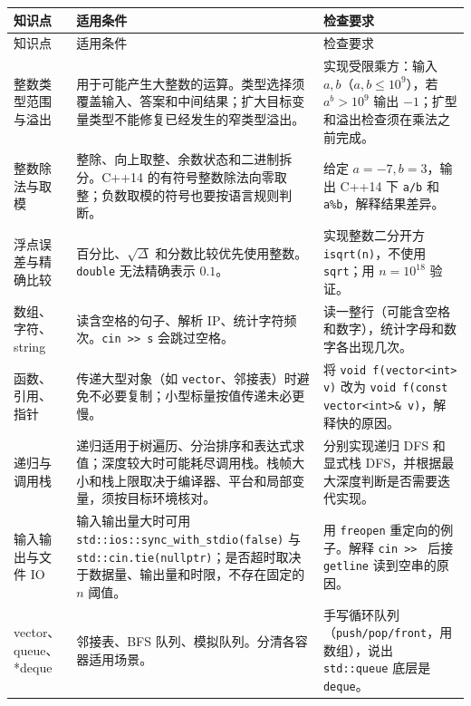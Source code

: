 \documentclass[a4paper,11pt]{article}
\newcommand{\code}[1]{\texttt{#1}}
\begin{document}
\begin{longtable}{L{2.4cm} L{7.5cm} L{6.8cm}}
\toprule
知识点 & 适用条件 & 检查要求 \\
\midrule
\endfirsthead
\toprule
知识点 & 适用条件 & 检查要求 \\
\midrule
\endhead
\endfoot
\bottomrule
\endlastfoot

整数类型范围与溢出
& 用于可能产生大整数的运算。类型选择须覆盖输入、答案和中间结果；扩大目标变量类型不能修复已经发生的窄类型溢出。
& 实现受限乘方：输入 $a,b$（$a,b\le10^9$），若 $a^b>10^9$ 输出 $-1$；扩型和溢出检查须在乘法之前完成。 \\[2mm]

整数除法与取模
& 整除、向上取整、余数状态和二进制拆分。C++14 的有符号整数除法向零取整；负数取模的符号也要按语言规则判断。
& 给定 $a=-7,b=3$，输出 C++14 下 \code{a/b} 和 \code{a\%b}，解释结果差异。 \\[2mm]

浮点误差与精确比较
& 百分比、$\sqrt{\Delta}$ 和分数比较优先使用整数。\code{double} 无法精确表示 $0.1$。
& 实现整数二分开方 \code{isqrt(n)}，不使用 \code{sqrt}；用 $n=10^{18}$ 验证。 \\[2mm]

数组、字符、string
& 读含空格的句子、解析 IP、统计字符频次。\code{cin >> s} 会跳过空格。
& 读一整行（可能含空格和数字），统计字母和数字各出现几次。 \\[2mm]

函数、引用、指针
& 传递大型对象（如 \code{vector}、邻接表）时避免不必要复制；小型标量按值传递未必更慢。
& 将 \code{void f(vector<int> v)} 改为 \code{void f(const vector<int>\& v)}，解释快的原因。 \\[2mm]

递归与调用栈
& 递归适用于树遍历、分治排序和表达式求值；深度较大时可能耗尽调用栈。栈帧大小和栈上限取决于编译器、平台和局部变量，须按目标环境核对。
& 分别实现递归 DFS 和显式栈 DFS，并根据最大深度判断是否需要迭代实现。 \\[2mm]

输入输出与文件 IO
& 输入输出量大时可用 \code{std::ios::sync\_with\_stdio(false)} 与 \code{std::cin.tie(nullptr)}；是否超时取决于数据量、输出量和时限，不存在固定的 $n$ 阈值。
& 用 \code{freopen} 重定向的例子。解释 \code{cin >> } 后接 \code{getline} 读到空串的原因。 \\[2mm]

vector、queue、*deque
& 邻接表、BFS 队列、模拟队列。分清各容器适用场景。
& 手写循环队列（\code{push/pop/front}，用数组），说出 \code{std::queue} 底层是 \code{deque}。 \\[2mm]


\end{longtable}
\end{document}
